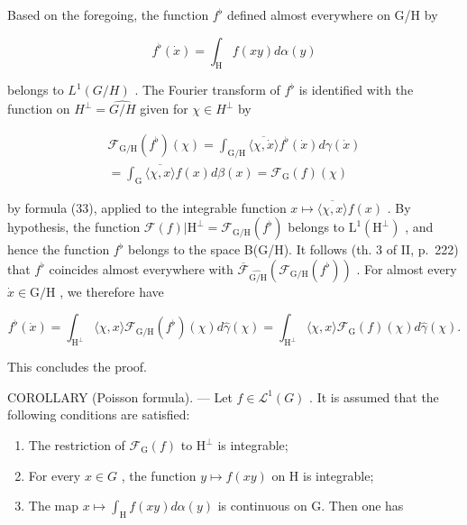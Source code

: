Based on the foregoing, the function \(f^{\flat}\) defined almost everywhere on G/H by

\[
f ^ {\flat} (\dot {x}) = \int_ {\mathrm{H}} f (x y) d \alpha (y)
\]

belongs to \(L^{1}(G/H)\) . The Fourier transform of \(f^{\flat}\) is identified with the function on \(H^{\perp} = \widehat{G/H}\) given for \(\chi \in H^{\perp}\) by

\[
\begin{array}{r} \mathcal {F} _ {\mathrm{G/H}} (f ^ {\flat}) (\chi) = \int_ {\mathrm{G/H}} \overline {{\langle \chi , \dot {x} \rangle}} f ^ {\flat} (\dot {x}) d \gamma (\dot {x}) \\ = \int_ {\mathrm{G}} \overline {{\langle \chi , x \rangle}} f (x) d \beta (x) = \mathcal {F} _ {\mathrm{G}} (f) (\chi) \end{array}
\]

by formula (33), applied to the integrable function \(x \mapsto \overline{\langle\chi, x\rangle} f(x)\) . By hypothesis, the function \(\mathcal{F}(f)|\mathrm{H}^{\perp} = \mathcal{F}_{\mathrm{G}/\mathrm{H}}(f^{\flat})\) belongs to \(\mathrm{L}^{1}(\mathrm{H}^{\perp})\) , and hence the function \(f^{\flat}\) belongs to the space B(G/H). It follows (th. 3 of II, p.~222) that \(f^{\flat}\) coincides almost everywhere with \(\overline{\mathcal{F}}_{\widehat{\mathrm{G / H}}}(\mathcal{F}_{\mathrm{G / H}}(f^{\flat}))\) . For almost every \(\dot{x}\in \mathrm{G / H}\) , we therefore have

\[
f ^ {\flat} (\dot {x}) = \int_ {\mathrm{H} ^ {\perp}} \langle \chi , x \rangle \mathcal {F} _ {\mathrm{G/H}} (f ^ {\flat}) (\chi) d \widehat {\gamma} (\chi) = \int_ {\mathrm{H} ^ {\perp}} \langle \chi , x \rangle \mathcal {F} _ {\mathrm{G}} (f) (\chi) d \widehat {\gamma} (\chi).
\]

This concludes the proof.

COROLLARY (Poisson formula). --- Let \(f \in \mathcal{L}^{1}(G)\) . It is assumed that the following conditions are satisfied:

\begin{enumerate}
\def\labelenumi{(\roman{enumi})}
\item
  The restriction of \(\mathcal{F}_{\mathrm{G}}(f)\) to \(\mathrm{H}^{\perp}\) is integrable;
\item
  For every \(x \in G\) , the function \(y \mapsto f(xy)\) on H is integrable;
\item
  The map \(x\mapsto \int_{\mathrm{H}}f(xy)d\alpha (y)\) is continuous on G. Then one has
\end{enumerate}

